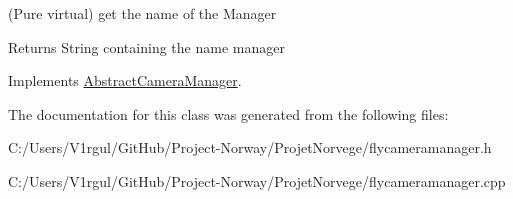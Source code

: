 (Pure virtual) get the name of the Manager 

\begin{DoxyReturn}{Returns}
String containing the name manager 
\end{DoxyReturn}


Implements \hyperlink{class_abstract_camera_manager_a6e4b041842471b9ed42ddd5c9ab260d1}{Abstract\-Camera\-Manager}.



The documentation for this class was generated from the following files\-:\begin{DoxyCompactItemize}
\item 
C\-:/\-Users/\-V1rgul/\-Git\-Hub/\-Project-\/\-Norway/\-Projet\-Norvege/flycameramanager.\-h\item 
C\-:/\-Users/\-V1rgul/\-Git\-Hub/\-Project-\/\-Norway/\-Projet\-Norvege/flycameramanager.\-cpp\end{DoxyCompactItemize}
